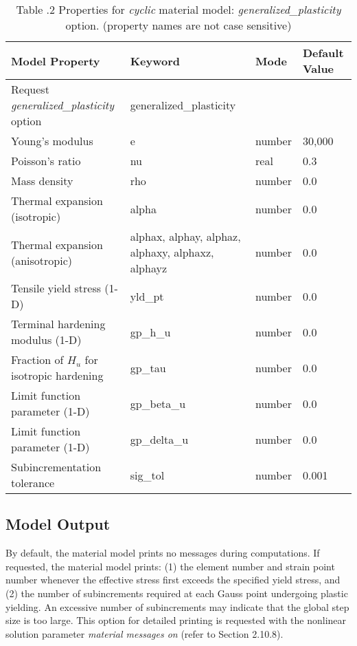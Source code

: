 \documentclass[11pt]{report}
\numberwithin{equation}{section}
\begin{document}
\begin{table}[htb]	
\small
	\centering
		\begin{tabular}{ |p{2.5in} | p{1.5in} | p{0.8in} |p{0.7in} | }
		\hline
		Model Property & Keyword & Mode & Default Value \\
		\hline \hline
Request \textit{generalized\_plasticity} option &generalized\_plasticity &\  &\  \\ \hline
Young's modulus	& e	& number	& 30,000 \\ \hline
Poisson's ratio	& nu	 & real	& 0.3 \\ \hline
Mass density	& rho & 	number	& 0.0 \\ \hline
Thermal expansion (isotropic)	& alpha & 	number	& 0.0 \\ \hline
Thermal expansion (anisotropic) & alphax, alphay, alphaz, alphaxy, alphaxz, alphayz & number & 0.0 \\ \hline
Tensile yield stress (1-D)	& yld\_pt	& number	& 0.0 \\ \hline
Terminal hardening modulus (1-D)	&  gp\_h\_u	& number	& 0.0 \\ \hline
Fraction of $H_u$ for isotropic hardening & gp\_tau & number &  0.0 \\ \hline
Limit function parameter (1-D) & 	gp\_beta\_u & 	number	& 0.0 \\ \hline
Limit function parameter (1-D) & 	gp\_delta\_u	 & number	& 0.0 \\ \hline
Subincrementation tolerance	& sig\_tol & 	number &	0.001 \\ \hline
		\end{tabular}
  \caption{\small Table \thesection.2 
Properties for \textit{cyclic} material model: \textit{generalized\_plasticity} option. (property names are 
not case sensitive)
\normalsize}
	\label{table:generalized_plasticity}
\end{table}

\subsection {Model Output}
By default, the material model prints no messages during computations. If 
requested, the material model prints: (1) the element number and strain 
point number whenever the effective stress first exceeds the 
specified yield stress, and (2) the 
number of subincrements required at each Gauss point 
undergoing plastic yielding. An excessive number of 
subincrements may indicate that the global step size is too large. 
This option for detailed printing is requested with the nonlinear solution 
parameter \textit{material messages on} (refer to Section 2.10.8).
\end{document}
